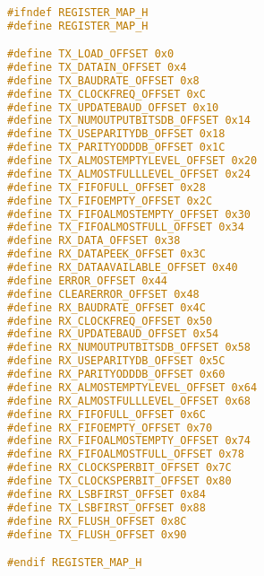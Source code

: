 \begin{lstlisting}[language=C,frame=single,label={lst:header}]

#ifndef REGISTER_MAP_H
#define REGISTER_MAP_H

#define TX_LOAD_OFFSET 0x0
#define TX_DATAIN_OFFSET 0x4
#define TX_BAUDRATE_OFFSET 0x8
#define TX_CLOCKFREQ_OFFSET 0xC
#define TX_UPDATEBAUD_OFFSET 0x10
#define TX_NUMOUTPUTBITSDB_OFFSET 0x14
#define TX_USEPARITYDB_OFFSET 0x18
#define TX_PARITYODDDB_OFFSET 0x1C
#define TX_ALMOSTEMPTYLEVEL_OFFSET 0x20
#define TX_ALMOSTFULLLEVEL_OFFSET 0x24
#define TX_FIFOFULL_OFFSET 0x28
#define TX_FIFOEMPTY_OFFSET 0x2C
#define TX_FIFOALMOSTEMPTY_OFFSET 0x30
#define TX_FIFOALMOSTFULL_OFFSET 0x34
#define RX_DATA_OFFSET 0x38
#define RX_DATAPEEK_OFFSET 0x3C
#define RX_DATAAVAILABLE_OFFSET 0x40
#define ERROR_OFFSET 0x44
#define CLEARERROR_OFFSET 0x48
#define RX_BAUDRATE_OFFSET 0x4C
#define RX_CLOCKFREQ_OFFSET 0x50
#define RX_UPDATEBAUD_OFFSET 0x54
#define RX_NUMOUTPUTBITSDB_OFFSET 0x58
#define RX_USEPARITYDB_OFFSET 0x5C
#define RX_PARITYODDDB_OFFSET 0x60
#define RX_ALMOSTEMPTYLEVEL_OFFSET 0x64
#define RX_ALMOSTFULLLEVEL_OFFSET 0x68
#define RX_FIFOFULL_OFFSET 0x6C
#define RX_FIFOEMPTY_OFFSET 0x70
#define RX_FIFOALMOSTEMPTY_OFFSET 0x74
#define RX_FIFOALMOSTFULL_OFFSET 0x78
#define RX_CLOCKSPERBIT_OFFSET 0x7C
#define TX_CLOCKSPERBIT_OFFSET 0x80
#define RX_LSBFIRST_OFFSET 0x84
#define TX_LSBFIRST_OFFSET 0x88
#define RX_FLUSH_OFFSET 0x8C
#define TX_FLUSH_OFFSET 0x90

#endif REGISTER_MAP_H
\end{lstlisting}

